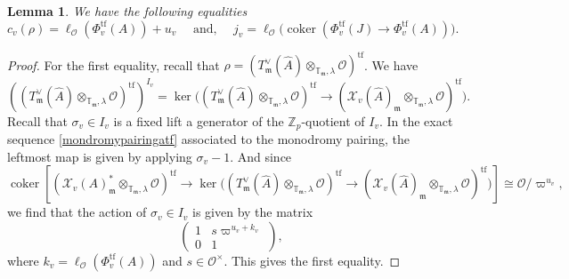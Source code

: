 \documentclass[a4paper, notitlepage, 10pt]{amsart}
\theoremstyle{plain} %
\newtheorem{lemma}[theorem]{Lemma}
\theoremstyle{definition} %
\theoremstyle{remark} %
\numberwithin{equation}{section}
\newcommand{\bbT}{\mathbb T}
\newcommand{\bbZ}{\mathbb Z}
\newcommand{\coker}{\operatorname{coker}} %
\newcommand{\tf}{\operatorname{tf}} %
\begin{document}
\begin{lemma}\label{someequalities}
    We have the following equalities
    $$ c_v(\rho)=\ell_{\mathcal{O}}(\Phi_v^{\tf}(A))+u_v \quad \text{ and, }\quad j_v=\ell_{\mathcal{O}}\big(\coker(\Phi^{\tf}_v(J)\to \Phi^{\tf}_v(A))\big). $$
\end{lemma}
\begin{proof}
For the first equality, recall that $\rho=(T^\vee_{\mathfrak{m}}(\hat{A})\otimes_{\bbT_{\mathfrak{m}},\lambda}\mathcal{O})^{\tf}$. We have 
$$ ((T^\vee_{\mathfrak{m}}(\hat{A})\otimes_{\bbT_{\mathfrak{m}},\lambda}\mathcal{O})^{\tf})^{I_{v}}= \ker\big( (T^\vee_{\mathfrak{m}}(\hat{A})\otimes_{\bbT_{\mathfrak{m}},\lambda}\mathcal{O})^{\tf} \to (\mathcal{X}_v(\hat{A})_{\mathfrak{m}}\otimes_{\bbT_{\mathfrak{m}},\lambda}\mathcal{O})^{\tf}\big).$$
Recall that $\sigma_v\in I_v$ is a fixed lift a generator of the $\bbZ_p$-quotient of $I_v$. 
In the exact sequence \eqref{mondromypairingatf} associated to the monodromy pairing, the leftmost map is given by applying $\sigma_v-1$.  And since $$\coker\left[(\mathcal{X}_v(A)^*_{\mathfrak{m}}\otimes_{\bbT_{\mathfrak{m}},\lambda}\mathcal{O})^{\tf}\to \ker\Big( (T^\vee_{\mathfrak{m}}(\hat{A})\otimes_{\bbT_{\mathfrak{m}},\lambda}\mathcal{O})^{\tf} \to (\mathcal{X}_v(\hat{A})_{\mathfrak{m}}\otimes_{\bbT_{\mathfrak{m}},\lambda}\mathcal{O})^{\tf}\Big)\right]\cong \mathcal{O}/\varpi^{u_v}, $$
we find that the action of $\sigma_v\in I_v$ is given by the matrix   $$  \begin{pmatrix}
        1 & s\varpi^{u_v+k_v}
        \\ 0 & 1 
    \end{pmatrix},$$ where $k_v=\ell_{\mathcal{O}}(\Phi^{\tf}_v(A))$ and $s\in \mathcal{O}^\times$. This gives the first equality.


\end{proof}
\end{document}
